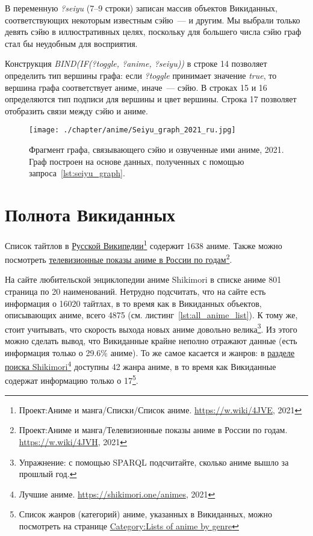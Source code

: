 В переменную \emph{?seiyu} (\num{7}--\num{9} строки) записан массив объектов Викиданных, соответствующих некоторым известным сэйю~---  и другим. Мы выбрали только девять сэйю в иллюстративных целях, поскольку для большего числа сэйю граф стал бы неудобным для восприятия.

Конструкция \emph{BIND(IF(?toggle, ?anime, ?seiyu))} в строке \num{14} позволяет определить тип вершины графа: если \emph{?toggle} принимает значение \emph{true}, то вершина графа соответствует аниме, иначе~--- сэйю. В строках \num{15} и \num{16} определяются тип подписи для вершины и цвет вершины. Строка \num{17} позволяет отобразить связи между сэйю и аниме.

\newpage
{}
\begin{fullwidth}
\begin{figure*}[h]
	\texttt{[image: ./chapter/anime/Seiyu\_graph\_2021\_ru.jpg]}
	\caption[Граф сэйю и аниме, 2021 год.]{Фрагмент графа, связывающего сэйю и озвученные ими аниме, 2021. Граф построен на основе данных, полученных с помощью запроса~\protect\ref{lst:seiyu_graph}.}%
      \label{fig:Seiyu_graph_2021_ru}%
\end{figure*} 
\end{fullwidth}

\section{Полнота Викиданных}

Список тайтлов в \href{https://w.wiki/4JVE}{Русской Википедии}\footnote{Проект:Аниме и манга/Списки/Список аниме. \href{https://w.wiki/4JVE}{https://w.wiki/4JVE}, 2021} содержит \num{1638} аниме. Также можно посмотреть \href{https://w.wiki/4JVH}{телевизионные показы аниме в России по годам}\footnote{Проект:Аниме и манга/Телевизионные показы аниме в России по годам. \href{https://w.wiki/4JVH}{https://w.wiki/4JVH}, 2021}.

На сайте любительской энциклопедии аниме Shikimori\autocite{shikimori} в списке аниме \num{801} страница по \num{20} наименований. Нетрудно подсчитать, что на сайте есть информация о \num{16020} тайтлах, в то время как в Викиданных объектов, описывающих аниме, всего \num{4875} (см. листинг~\ref{lst:all_anime_list}). К тому же, стоит учитывать, что скорость выхода новых аниме довольно велика\footnote{Упражнение: с помощью SPARQL подсчитайте, сколько аниме вышло за прошлый год.}. Из этого можно сделать вывод, что Викиданные крайне неполно отражают данные (есть информация только о \num{29.6}\% аниме). То же самое касается и жанров: в \href{https://shikimori.one/animes}{разделе поиска Shikimori}\footnote{Лучшие аниме. \href{https://shikimori.one/animes}{https://shikimori.one/animes}, 2021} доступны \num{42} жанра аниме, в то время как Викиданные содержат информацию только о \num{17}\footnote{Список жанров (категорий) аниме, указанных в Викиданных, можно посмотреть на странице \href{https://en.wikipedia.org/wiki/Category:Lists\_of_anime\_by\_genre}{Category:Lists of anime by genre}}.

